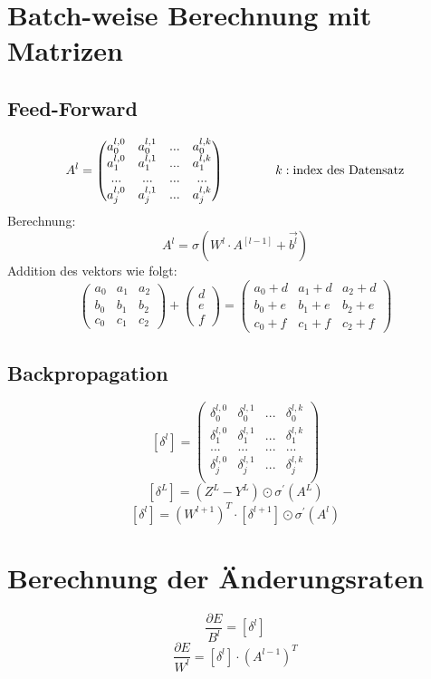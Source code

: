 \documentclass{article}
\begin{document}
\section{Batch-weise Berechnung mit Matrizen}
\subsection{Feed-Forward}
 \[ A^l = 
 \begin{pmatrix}
    a_0^{l,0} & a_0^{l,1} & ... & a_0^{l,k} \\
    a_1^{l,0} & a_1^{l,1} & ... & a_1^{l,k} \\
    ... & ... & ... & ... \\
    a_j^{l,0} & a_j^{l,1} & ... & a_j^{l,k} \\
 \end{pmatrix}
 \kern 40pt
 k : \text{index des Datensatz} \]
 Berechnung:
  \[ A^l = \sigma (W^l \cdot A^{[l-1]} + \vec{b^l}) \]
Addition des vektors wie folgt:
 \[ \begin{pmatrix}
    a_0 & a_1 & a_2 \\
    b_0 & b_1 & b_2 \\
    c_0 & c_1 & c_2
 \end{pmatrix} 
 + \begin{pmatrix}
    d \\ e \\ f
 \end{pmatrix} 
 = \begin{pmatrix}
    a_0 + d & a_1 + d & a_2 + d\\
    b_0 + e & b_1 + e & b_2 + e \\
    c_0 + f & c_1 + f & c_2 + f
 \end{pmatrix}\]
 \subsection{Backpropagation}
 \[ [\delta^l] =
 \begin{pmatrix}
    \delta_0^{l,0} & \delta_0^{l,1} & ... & \delta_0^{l,k} \\
    \delta_1^{l,0} & \delta_1^{l,1} & ... & \delta_1^{l,k} \\
    ... & ... & ... & ... \\
    \delta_j^{l,0} & \delta_j^{l,1} & ... & \delta_j^{l,k} \\
 \end{pmatrix} \]
  \[ [\delta^L] = (Z^L - Y^L) \odot \sigma^{\prime}(A^L) \]
 \[ [\delta^l] = (W^{l+1})^T \cdot [\delta^{l+1}] \odot \sigma^{\prime}(A^l) \]
 \section{Berechnung der Änderungsraten}
  \[ \frac{\partial E}{B^l} = [\delta^l] \]
  \[ \frac{\partial E}{W^l} = [\delta^l] \cdot (A^{l-1})^T \]
\end{document}
